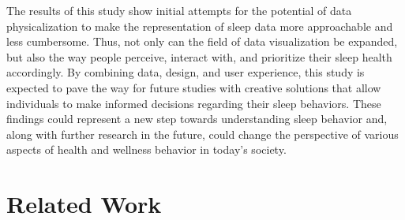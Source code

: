 \documentclass[
  a4paper,  %
  twoside,  %
  bibliography=totoc,
  headsepline,
  cleardoublepage=empty,
  parskip=half,
  draft=false
]{scrbook}
\begin{document}
The results of this study show initial attempts for the potential of data physicalization to make the representation of sleep data more approachable and less cumbersome. Thus, not only can the field of data visualization be expanded, but also the way people perceive, interact with, and prioritize their sleep health accordingly. By combining data, design, and user experience, this study is expected to pave the way for future studies with creative solutions that allow individuals to make informed decisions regarding their sleep behaviors. These findings could represent a new step towards understanding sleep behavior and, along with further research in the future, could change the perspective of various aspects of health and wellness behavior in today's society.



\chapter{Related Work}
\end{document}
